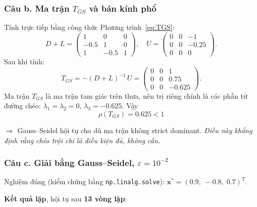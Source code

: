 \documentclass[12pt,a4paper]{article}
\begin{document}
\subsubsection{Câu b. Ma trận $T_{GS}$ và bán kính phổ}

Tính trực tiếp bằng công thức Phương trình~\eqref{eq:TGS}:
\[
    D+L = \begin{pmatrix} 1 & 0 & 0 \\ -0.5 & 1 & 0 \\ 1 & -0.5 & 1 \end{pmatrix},\quad
    U = \begin{pmatrix} 0 & 0 & -1 \\ 0 & 0 & -0.25 \\ 0 & 0 & 0 \end{pmatrix}.
\]
Sau khi tính:
\[
    T_{GS} = -(D+L)^{-1}\,U = \begin{pmatrix} 0 & 0 & 1 \\ 0 & 0 & 0.75 \\ 0 & 0 & -0.625 \end{pmatrix}.
\]
Ma trận $T_{GS}$ là ma trận tam giác trên thưa, nên trị riêng chính là các phần tử đường chéo: $\lambda_1 = \lambda_2 = 0$, $\lambda_3 = -0.625$. Vậy
\begin{equation}
    \boxed{\;\rho(T_{GS}) = 0.625 < 1\;}
\end{equation}

$\Longrightarrow$ Gauss--Seidel hội tụ cho dù ma trận không strict dominant. \emph{Điều này khẳng định rằng chéo trội chỉ là điều kiện đủ, không cần.}

\subsubsection{Câu c. Giải bằng Gauss--Seidel, $\varepsilon = 10^{-2}$}

Nghiệm đúng (kiểm chứng bằng \texttt{np.linalg.solve}): $\mathbf{x}^\ast = (0.9,\; -0.8,\; 0.7)^T$.

\textbf{Kết quả lặp}, hội tụ sau \textbf{13 vòng lặp}:
\end{document}
